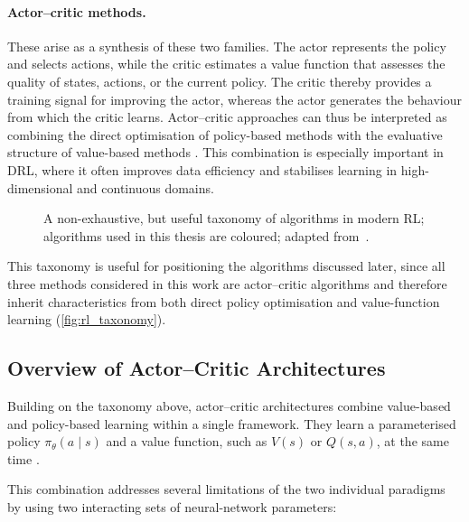 \paragraph{Actor--critic methods.} These arise as a synthesis of these two families. The actor represents the policy and selects actions, while the critic estimates a value function that assesses the quality of states, actions, or the current policy. The critic thereby provides a training signal for improving the actor, whereas the actor generates the behaviour from which the critic learns. Actor--critic approaches can thus be interpreted as combining the direct optimisation of policy-based methods with the evaluative structure of value-based methods \cite{barto_neuronlike_1983, sutton_reinforcement_2020}. This combination is especially important in \ac{DRL}, where it often improves data efficiency and stabilises learning in high-dimensional and continuous domains.

\begin{figure}[htbp]
  \centering
  
  \caption[Taxonomy of RL algorithms]{A non-exhaustive, but useful taxonomy of algorithms in modern RL; algorithms used in this thesis are coloured; adapted from~\cite{openai_part_nodate}.}
  \label{fig:rl_taxonomy}
\end{figure}

This taxonomy is useful for positioning the algorithms discussed later, since all three methods considered in this work are actor--critic algorithms and therefore inherit characteristics from both direct policy optimisation and value-function learning (\autoref{fig:rl_taxonomy}).

\subsection{Overview of Actor--Critic Architectures}
\label{subsec:actor-critic-architectures}
Building on the taxonomy above, actor--critic architectures combine value-based and policy-based learning within a single framework. They learn a parameterised policy $\pi_{\theta}(a \mid s)$ and a value function, such as $V(s)$ or $Q(s,a)$, at the same time \cite{sutton_reinforcement_2020}.

This combination addresses several limitations of the two individual paradigms by using two interacting sets of neural-network parameters:


